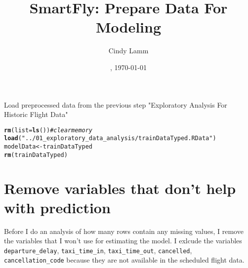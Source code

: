 \documentclass{article}\usepackage[]{graphicx}\usepackage[]{color}
\makeatletter
\newcommand{\hlstr}[1]{\textcolor[rgb]{0.192,0.494,0.8}{#1}}%
\newcommand{\hlcom}[1]{\textcolor[rgb]{0.678,0.584,0.686}{\textit{#1}}}%
\newcommand{\hlstd}[1]{\textcolor[rgb]{0.345,0.345,0.345}{#1}}%
\newcommand{\hlkwb}[1]{\textcolor[rgb]{0.69,0.353,0.396}{#1}}%
\newcommand{\hlkwc}[1]{\textcolor[rgb]{0.333,0.667,0.333}{#1}}%
\newcommand{\hlkwd}[1]{\textcolor[rgb]{0.737,0.353,0.396}{\textbf{#1}}}%
\newenvironment{kframe}{%
 \def\at@end@of@kframe{}%
 \ifinner\ifhmode%
  \def\at@end@of@kframe{\end{minipage}}%
  \begin{minipage}{\columnwidth}%
 \fi\fi%
 \def\FrameCommand##1{\hskip\@totalleftmargin \hskip-\fboxsep
 \colorbox{shadecolor}{##1}\hskip-\fboxsep
     \hskip-\linewidth \hskip-\@totalleftmargin \hskip\columnwidth}%
 \MakeFramed {\advance\hsize-\width
   \@totalleftmargin\z@ \linewidth\hsize
   \@setminipage}}%
 {\par\unskip\endMakeFramed%
 \at@end@of@kframe}
\newenvironment{knitrout}{}{} %
\makeatother
\begin{document}
\date{\currenttime, \today}
\title{SmartFly: Prepare Data For Modeling}
\author{Cindy Lamm}

\maketitle

Load preprocessed data from the previous step "Exploratory Analysis For Historic Flight Data"
\begin{knitrout}
\color{fgcolor}\begin{kframe}
\begin{alltt}
\hlkwd{rm}\hlstd{(}\hlkwc{list}\hlstd{=}\hlkwd{ls}\hlstd{())}   \hlcom{#clear memory}
\hlkwd{load}\hlstd{(}\hlstr{"../01_exploratory_data_analysis/trainDataTyped.RData"}\hlstd{)}
\hlstd{modelData} \hlkwb{<-} \hlstd{trainDataTyped}
\hlkwd{rm}\hlstd{(trainDataTyped)}
\end{alltt}
\end{kframe}
\end{knitrout}

\section{Remove variables that don't help with prediction}

Before I do an analysis of how many rows contain any missing values, I remove the variables that I won't use for estimating the model. I exlcude the variables \verb+departure_delay+, \verb+taxi_time_in+, \verb+taxi_time_out+, \verb+cancelled+, \verb+cancellation_code+ because they are not available in the scheduled flight data.
\end{document}
